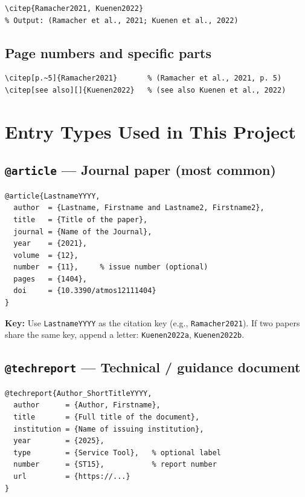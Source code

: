 \documentclass[11pt, a4paper]{article}
\begin{document}
\begin{lstlisting}
\citep{Ramacher2021, Kuenen2022}
% Output: (Ramacher et al., 2021; Kuenen et al., 2022)
\end{lstlisting}

\subsection{Page numbers and specific parts}

\begin{lstlisting}
\citep[p.~5]{Ramacher2021}       % (Ramacher et al., 2021, p. 5)
\citep[see also][]{Kuenen2022}   % (see also Kuenen et al., 2022)
\end{lstlisting}

\section{Entry Types Used in This Project}

\subsection{\texttt{@article} --- Journal paper (most common)}

\begin{lstlisting}
@article{LastnameYYYY,
  author  = {Lastname, Firstname and Lastname2, Firstname2},
  title   = {Title of the paper},
  journal = {Name of the Journal},
  year    = {2021},
  volume  = {12},
  number  = {11},     % issue number (optional)
  pages   = {1404},
  doi     = {10.3390/atmos12111404}
}
\end{lstlisting}

\textbf{Key:} Use \texttt{LastnameYYYY} as the citation key (e.g.,
\texttt{Ramacher2021}). If two papers share the same key, append a letter:
\texttt{Kuenen2022a}, \texttt{Kuenen2022b}.

\subsection{\texttt{@techreport} --- Technical / guidance document}

\begin{lstlisting}
@techreport{Author_ShortTitleYYYY,
  author      = {Author, Firstname},
  title       = {Full title of the document},
  institution = {Name of issuing institution},
  year        = {2025},
  type        = {Service Tool},   % optional label
  number      = {ST15},           % report number
  url         = {https://...}
}
\end{lstlisting}
\end{document}
